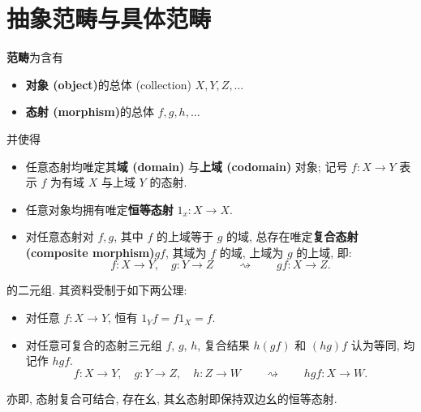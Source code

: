 \section{抽象范畴与具体范畴}
\begin{definition}\label{Def:Category}
    \textbf{范畴}为含有
        \begin{itemize}
            \item \textbf{对象 (object)}的总体 (collection) \(X,Y,Z,\dots\)
            \item \textbf{态射 (morphism)}的总体 \(f,g,h,\dots\)
        \end{itemize}
    并使得
        \begin{itemize}
            \item 任意态射均唯定其\textbf{域 (domain)} 与\textbf{上域 (codomain)} 对象; 记号 \(f\colon X\to Y\) 表示 \(f\) 为有域 \(X\) 与上域 \(Y\) 的态射.
            \item 任意对象均拥有唯定\textbf{恒等态射} \(1_x\colon X\to X\).\footnotemark[4]
            \item 对任意态射对 \(f,g\), 其中 \(f\) 的上域等于 \(g\) 的域, 总存在唯定\textbf{复合态射 (composite morphism)}\footnotemark[5] \(gf\), 其域为 \(f\) 的域, 上域为 \(g\) 的上域, 即\footnotemark[6]:\[
                f\colon X\to Y,\quad g\colon Y\to Z\qquad\rightsquigarrow\qquad gf\colon X\to Z.\]
        \end{itemize}
    的二元组. 其资料受制于如下两公理:
        \begin{itemize}
            \item 对任意 \(f\colon X\to Y\), 恒有 \(1_Yf=f1_X=f\).
            \item 对任意可复合的态射三元组 \(f\), \(g\), \(h\), 复合结果 \(h(gf)\) 和 \((hg)f\) 认为等同, 均记作 \(hgf\).\[
                    f\colon X\to Y,\quad g\colon Y\to Z,\quad h\colon Z\to W\qquad\rightsquigarrow\qquad hgf\colon X\to W.
                \]
        \end{itemize}
    亦即, 态射复合可结合, 存在幺, 其幺态射即保持双边幺的恒等态射.
\end{definition}
